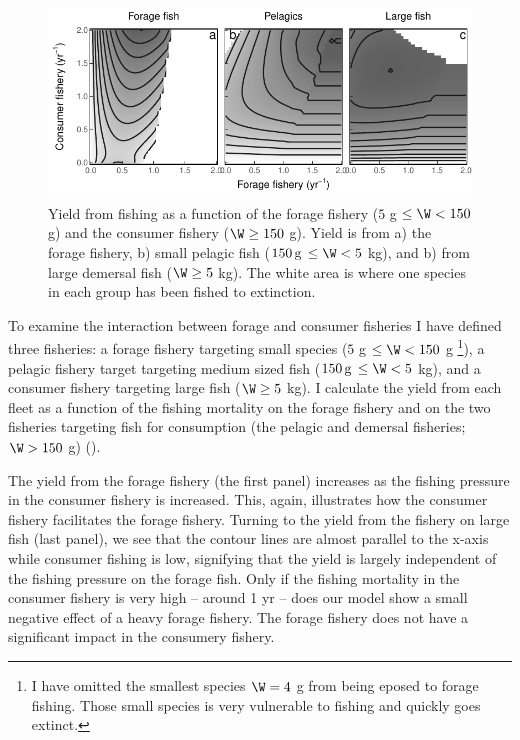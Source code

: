 \begin{figure}[t]
  \centering
  \includegraphics{ChapterCommunityFishing/ForageFishing.pdf}
  \caption{Yield from fishing as a function of the forage fishery ($5$ g $\le \W < 150$ g) and the consumer fishery ($\W \ge 150$ g).  Yield is from a) the forage fishery, b) small pelagic fish ($150\, \mathrm{g}\, \le \W < 5$ kg), and b) from large demersal fish ($\W \ge 5$ kg). The white area is where one species in each group has been fished to extinction.}
  \label{fig:foragefishing}
\end{figure}

To examine the interaction between forage and consumer fisheries I have defined three fisheries: a forage fishery targeting small species ($5$ g $\le \W < 150$ g \footnote{I have omitted the smallest species $\W=4$ g from being eposed to forage fishing. Those small species is very vulnerable to fishing and quickly goes extinct.}), a pelagic fishery target targeting medium sized fish ($150\, \mathrm{g}\, \le \W < 5$ kg), and a consumer fishery targeting large fish ($\W \ge 5$ kg).  I calculate the yield from each fleet as a function of the fishing mortality on the forage fishery and on the two fisheries targeting fish for consumption (the pelagic and demersal fisheries; $\W > 150$ g) ().  

The yield from the forage fishery (the first panel) increases as the fishing pressure in the consumer fishery is increased.  This, again, illustrates how the consumer fishery facilitates the forage fishery.  Turning to the yield from the fishery on large fish (last panel), we see that the contour lines are almost parallel to the x-axis while consumer fishing is low, signifying that the yield is largely independent of the fishing pressure on the forage fish.  Only if the fishing mortality in the consumer fishery is very high -- around 1 yr{\per} -- does our model show a small negative effect of a heavy forage fishery.  The forage fishery does not have a significant impact in the consumery fishery. 

